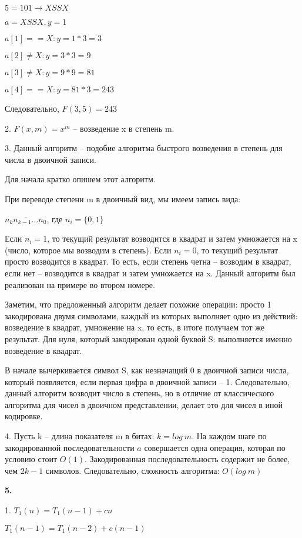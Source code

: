 \documentclass[12pt]{extreport}
\begin{document}
$5 = 101 \rightarrow  X S S X$ 

$a = X S S X, y=1$

$a[1] == X: y =1*3 =3$

$a[2] \neq X: y =3*3 =9$

$a[3] \neq X: y =9*9 =81$

$a[4] == X: y =81*3 =243$

Следовательно, $F(3,5) = 243$

2. $F(x, m) = x^m$  -- возведение x в степень m.

3. Данный алгоритм -- подобие алгоритма быстрого возведения в степень для числа в двоичной записи. 

Для начала кратко опишем этот алгоритм. 

При переводе степени m в двоичный вид, мы имеем запись вида: 

$\overline{n_k n_{k-1} ... n_0}$, где $n_i =\{0,1\}$

Если $n_i = 1$, то текущий результат возводится в квадрат и затем умножается на x (число, которое мы возводим в степень). Если $ n_i = 0$, то текущий результат просто возводится в квадрат. То есть, если степень четна -- возводим в квадрат, если нет -- возводится в квадрат и затем умножается на x. Данный алгоритм был реализован на примере во втором номере. 

Заметим, что предложенный алгоритм делает похожие операции: просто 1 закодирована двумя символами, каждый из которых выполняет одно из действий: возведение в квадрат, умножение на x, то есть, в итоге получаем тот же результат. Для нуля, который закодирован одной буквой S: выполняется именно возведение в квадрат. 

В начале вычеркивается символ S, как незначащий 0 в двоичной записи числа, который появляется, если первая цифра в двоичной записи -- 1. Следовательно, данный алгоритм возводит число в степень, но в отличие от классического алгоритма для чисел в двоичном представлении, делает это для чисел в иной кодировке.

4. 
Пусть k -- длина показателя m в битах: $k = log \:m$. На каждом шаге по закодированной последовательности $a$ совершается одна операция, которая по условию стоит $O(1)$. Закодированная последовательность содержит не более, чем $2k-1$ символов. Следовательно, сложность алгоритма: $O(log \:m)$


\bigskip
{\bf 5.}

1.  $T_1(n) = T_1(n-1) + cn$ 

$T_1(n-1) = T_1(n-2) + c(n-1)$ 
\end{document}
